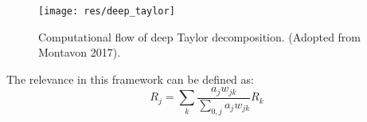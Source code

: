 \documentclass[a4paper,9pt]{beamer}
\theoremstyle{mytheoremstyle}
\begin{document}
\begin{frame}
\begin{figure}
\begin{center}
  \texttt{[image: res/deep\_taylor]}
\end{center}
	\caption{Computational flow of deep Taylor decomposition. (Adopted from Montavon 2017).}
\end{figure}
\begin{block}{}
The relevance in this framework can be defined as:
\begin{equation}
R_j = \sum _k \frac{a_j w_{jk}}{\sum _{0,j} a_j w_{jk}} R_k
\end{equation}
\end{block}
\end{frame}
\end{document}
